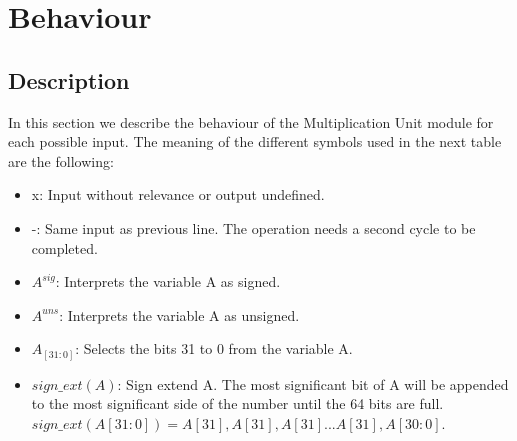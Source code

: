 \section{Behaviour}

\subsection{Description}

In this section we describe the behaviour of the Multiplication Unit module for each possible input.
The meaning of the different symbols used in the next table are the following:

\begin{itemize}
    \item x: Input without relevance or output undefined.
    \item -: Same input as previous line. The operation needs a second cycle to be completed.
    \item $A^{sig}$: Interprets the variable A as signed.
    \item $A^{uns}$: Interprets the variable A as unsigned.
    \item $A_{[31:0]}$: Selects the bits 31 to 0 from the variable A.
    \item $sign\_ext(A)$: Sign extend A. The most significant bit of A will be appended to the most significant side of the number until the 64 bits are full. \\
    $sign\_ext(A[31:0]) = A[31],A[31],A[31]...A[31],A[30:0]$.
\end{itemize}

\begin{table}[H]
\end{table}
